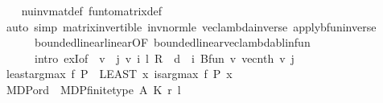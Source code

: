 \begin{isabellebody}
%
\isadelimproof
\ \ %
\endisadelimproof
%
\isatagproof
{}\isamarkupfalse%
\ nu{\isacharunderscore}{\kern0pt}inv{\isacharunderscore}{\kern0pt}mat{\isacharunderscore}{\kern0pt}def\ fun{\isacharunderscore}{\kern0pt}to{\isacharunderscore}{\kern0pt}matrix{\isacharunderscore}{\kern0pt}def\isanewline
\ \ \isamarkupfalse%
\ {\isacharparenleft}{\kern0pt}auto\ simp{\isacharcolon}{\kern0pt}\ matrix{\isacharunderscore}{\kern0pt}invertible\ inv{\isacharunderscore}{\kern0pt}norm{\isacharunderscore}{\kern0pt}le{\isacharprime}{\kern0pt}\ vec{\isacharunderscore}{\kern0pt}lambda{\isacharunderscore}{\kern0pt}inverse\ apply{\isacharunderscore}{\kern0pt}bfun{\isacharunderscore}{\kern0pt}inverse\ \isanewline
\ \ \ \ \ \ bounded{\isacharunderscore}{\kern0pt}linear{\isachardot}{\kern0pt}linear{\isacharbrackleft}{\kern0pt}OF\ bounded{\isacharunderscore}{\kern0pt}linear{\isacharunderscore}{\kern0pt}vec{\isacharunderscore}{\kern0pt}lambda{\isacharunderscore}{\kern0pt}blinfun{\isacharbrackright}{\kern0pt}\isanewline
\ \ \ \ \ \ intro{\isacharbang}{\kern0pt}{\isacharcolon}{\kern0pt}\ exI{\isacharbrackleft}{\kern0pt}of\ {\isacharunderscore}{\kern0pt}\ {\isachardoublequoteopen}{\isasymlambda}v{\isachardot}{\kern0pt}\ {\isacharparenleft}{\kern0pt}{\isasymchi}\ j{\isachardot}{\kern0pt}\ {\isacharparenleft}{\kern0pt}{\isasymlambda}v{\isachardot}{\kern0pt}\ {\isacharparenleft}{\kern0pt}{\isasymSum}i{\isachardot}{\kern0pt}\ {\isacharparenleft}{\kern0pt}l\ {\isacharasterisk}{\kern0pt}\isactrlsub R\ {\isasymP}\ d{\isacharparenright}{\kern0pt}\ {\isacharcircum}{\kern0pt}{\isacharcircum}{\kern0pt}\ i{\isacharparenright}{\kern0pt}\ {\isacharparenleft}{\kern0pt}Bfun\ v{\isacharparenright}{\kern0pt}{\isacharparenright}{\kern0pt}\ {\isacharparenleft}{\kern0pt}vec{\isacharunderscore}{\kern0pt}nth\ v{\isacharparenright}{\kern0pt}\ j{\isacharparenright}{\kern0pt}{\isachardoublequoteclose}{\isacharbrackright}{\kern0pt}{\isacharparenright}{\kern0pt}%
\endisatagproof
{\isafoldproof}%
%
\isadelimproof
\isanewline
%
\endisadelimproof
\isanewline
{}\isamarkupfalse%
\isanewline
\isanewline
{}\isamarkupfalse%
\ {\isachardoublequoteopen}least{\isacharunderscore}{\kern0pt}arg{\isacharunderscore}{\kern0pt}max\ f\ P\ {\isacharequal}{\kern0pt}\ {\isacharparenleft}{\kern0pt}LEAST\ x{\isachardot}{\kern0pt}\ is{\isacharunderscore}{\kern0pt}arg{\isacharunderscore}{\kern0pt}max\ f\ P\ x{\isacharparenright}{\kern0pt}{\isachardoublequoteclose}\isanewline
\isanewline
{}\isamarkupfalse%
\ MDP{\isacharunderscore}{\kern0pt}ord\ {\isacharequal}{\kern0pt}\ MDP{\isacharunderscore}{\kern0pt}finite{\isacharunderscore}{\kern0pt}type\ A\ K\ r\ l\isanewline

\end{isabellebody}
